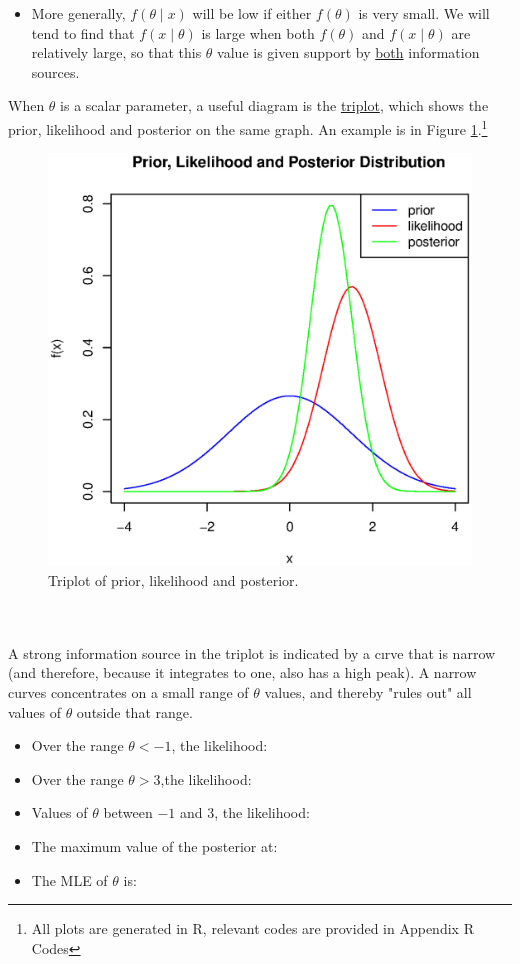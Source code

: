 \documentclass[lecture,12pt,]{pcms-l}
\numberwithin{section}{chapter}
\numberwithin{equation}{chapter}
\theoremstyle{plain}
\theoremstyle{definition}
\theoremstyle{definition}
\begin{document}
\begin{itemize}
\item More generally, $f(\theta \mid x)$ will be low if either $f(\theta)$ is very small.  We will tend to find that $f(x \mid \theta)$ is large when both $f(\theta)$ and $f(x \mid \theta)$ are relatively large, so that this $\theta$ value is given support by \underline{both} information sources.
\end{itemize}
When $\theta$ is a scalar parameter, a useful diagram is the \underline{triplot}, which shows the prior, likelihood and posterior on the same graph. An example is in Figure \ref{fig:Triplot}.\footnote{All plots are generated in R, relevant codes are provided in Appendix R Codes }
\begin{figure}
\centering
 \includegraphics[scale=0.7]{triplot}%
  \caption{Triplot of prior, likelihood and posterior. }
\label{fig:Triplot}
\end{figure} 
\\
\\
A strong information source in the triplot is indicated by a cırve that is narrow (and therefore, because it integrates to one, also has a high peak). A narrow curves concentrates on a small range of $\theta$ values, and thereby "rules out" all values of $\theta$ outside that range.

\vfill
\eject
\begin{itemize}
\item Over the range $\theta<-1$, the likelihood:
\item Over the range $\theta>3$,the likelihood:
\item Values of $\theta$ between $-1$ and $3$, the likelihood:
\item The maximum value of the posterior at:
\item The MLE of $\theta$ is:
\end{itemize}
\end{document}

